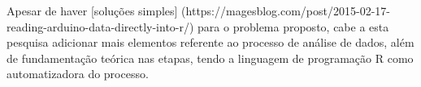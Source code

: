 Apesar de haver [soluções 
simples]
(https://magesblog.com/post/2015-02-17-reading-arduino-data-directly-into-r/) 
para o problema proposto, cabe a esta pesquisa adicionar mais elementos 
referente ao processo de análise de dados, além de fundamentação teórica nas 
etapas, tendo a linguagem de programação R como automatizadora do processo.